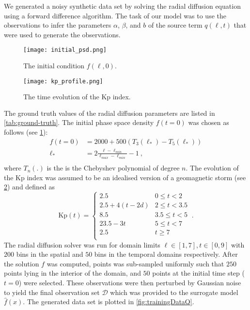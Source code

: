 We generated a noisy synthetic data set by solving the radial diffusion equation using a 
forward difference algorithm. The task of our model was to use the observations to infer the 
parameters $\alpha$, $\beta$, and $b$ of the source term $q(\ell, t)$ that were used to generate 
the observations.


\begin{figure*}[!htb]
  \centering
  \begin{subfigure}[b]{0.75\textwidth}
    \centering
    \texttt{[image: initial\_psd.png]}
    \caption{ 
      {\small The initial condition $f(\ell, 0)$.}
    }
    \label{fig:initialpsd}
  \end{subfigure}
  \hfill
  \begin{subfigure}[b]{0.75\textwidth}
    \centering
    \texttt{[image: kp\_profile.png]}
    \caption{
      {\small The time evolution of the Kp index.}
    }
    \label{fig:kpProfile}
  \end{subfigure}
  \caption{Synthetic data generation.}
\end{figure*}

 
The ground truth values of the radial diffusion parameters are listed in \cref{tab:ground-truth}.
%
The initial phase space density $f(t = 0)$ was chosen as follows (see \cref{fig:initialpsd}):
%
\begin{align*}
f(t = 0) &= 2000 + 500(T_{3}(\ell_*) - T_{5}(\ell_*)) \\
\ell_* &= 2\frac{\ell - \ell_{min}}{\ell_{max} - \ell_{min}} - 1 \ ,\\
\end{align*}
%
where $T_n(.)$ is the is the Chebyshev polynomial of degree $n$. The evolution of the Kp index was 
assumed to be an idealised version of a geomagnetic storm (see \cref{fig:kpProfile}) and 
defined as 
\[
  \mathrm{Kp}(t) = \left\{\begin{matrix}
    2.5 & 0 \leq t < 2\\ 
    2.5 + 4(t - 2d) & 2 \leq t < 3.5\\ 
    8.5 & 3.5 \leq  t < 5 \\ 
    23.5 - 3t & 5 \leq t < 7\\
    2.5 & t \geq 7\\ 
    \end{matrix}\right. \ .
\] 
%
The radial diffusion solver was run for domain limits $\ell \in [1, 7], t \in [0, 9]$ with $200$ 
bins in the spatial and $50$ bins in the temporal domains respectively. After the solution $f$ was 
computed, points was sub-sampled uniformly such that $250$ points lying in the interior of the 
domain, and $50$ points at the initial time step ($t = 0$) were selected. These observations were 
then perturbed by Gaussian noise to yield the final observation set $\mathcal{D}$ which was 
provided to the surrogate model $\hat{f}(x)$. The generated data set is plotted in 
\cref{fig:trainingDataQ}.


